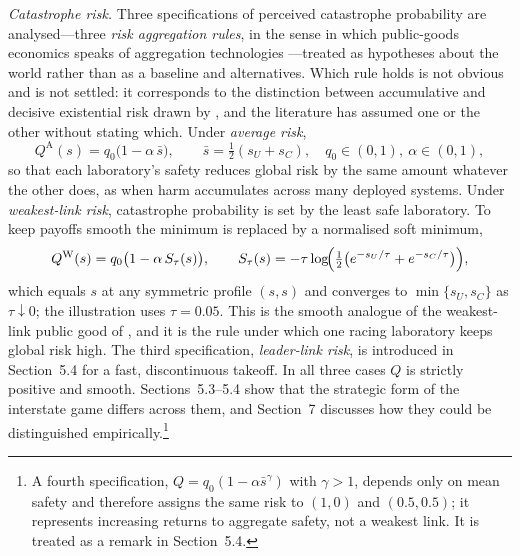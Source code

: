 \documentclass[11pt]{article}
\theoremstyle{plain}
\theoremstyle{definition}
\theoremstyle{remark}
\newcommand{\Sh}{\bar s}
\begin{document}
\emph{Catastrophe risk.} Three specifications of perceived catastrophe probability are analysed---three \emph{risk aggregation rules}, in the sense in which public-goods economics speaks of aggregation technologies \citep{hirshleifer1983}---treated as hypotheses about the world rather than as a baseline and alternatives. Which rule holds is not obvious and is not settled: it corresponds to the distinction between accumulative and decisive existential risk drawn by \citet{kasirzadeh2025}, and the literature has assumed one or the other without stating which. Under \emph{average risk},
\begin{equation}
Q^{\mathrm{A}}(s)=q_0\bigl(1-\alpha\,\Sh\bigr),\qquad \Sh=\tfrac12(s_U+s_C),\quad q_0\in(0,1),\ \alpha\in(0,1),
\label{eq:risk}
\end{equation}
so that each laboratory's safety reduces global risk by the same amount whatever the other does, as when harm accumulates across many deployed systems. Under \emph{weakest-link risk}, catastrophe probability is set by the least safe laboratory. To keep payoffs smooth the minimum is replaced by a normalised soft minimum,
\begin{equation}
Q^{\mathrm{W}}(s)=q_0\bigl(1-\alpha\,S_\tau(s)\bigr),\qquad S_\tau(s)=-\tau\log\!\Bigl(\tfrac12\bigl(e^{-s_U/\tau}+e^{-s_C/\tau}\bigr)\Bigr),
\label{eq:wl}
\end{equation}
which equals $s$ at any symmetric profile $(s,s)$ and converges to $\min\{s_U,s_C\}$ as $\tau\downarrow0$; the illustration uses $\tau=0.05$. This is the smooth analogue of the weakest-link public good of \citet{hirshleifer1983}, and it is the rule under which one racing laboratory keeps global risk high. The third specification, \emph{leader-link risk}, is introduced in Section~5.4 for a fast, discontinuous takeoff. In all three cases $Q$ is strictly positive and smooth. Sections~5.3--5.4 show that the strategic form of the interstate game differs across them, and Section~7 discusses how they could be distinguished empirically.\footnote{A fourth specification, $Q=q_0(1-\alpha\Sh^{\gamma})$ with $\gamma>1$, depends only on mean safety and therefore assigns the same risk to $(1,0)$ and $(0.5,0.5)$; it represents increasing returns to aggregate safety, not a weakest link. It is treated as a remark in Section~5.4.}
\end{document}
